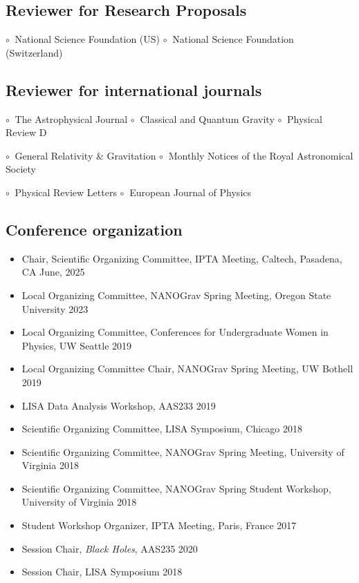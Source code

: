 \documentclass[11pt,letterpaper,sans,unicode]{moderncv}
\newcommand{\confitem}[2]{\item #1 \hfill #2} %
\newcommand{\blucirc}{{\color{color1} $\circ\;\;$}}
\begin{document}
 \vspace{-0.1cm}

 \vspace{-0.1cm}

\subsection{Reviewer for Research Proposals}
\hspace{0.5mm} \blucirc National Science Foundation (US)  \hfill \blucirc National Science Foundation (Switzerland) \hfill

\subsection{Reviewer for international journals}
\hspace{0.5mm} \blucirc The Astrophysical Journal  \hfill \blucirc Classical and Quantum Gravity \hfill \hspace{-0.2cm} \blucirc Physical Review D

\hspace{0.5mm} \blucirc General Relativity \& Gravitation  \hfill \blucirc Monthly Notices of the Royal Astronomical Society

\hspace{0.5mm} \blucirc Physical Review Letters  \hfill \blucirc European Journal of Physics


\subsection{Conference organization}
	\begin{itemize}[leftmargin=8mm]
	\confitem{Chair, Scientific Organizing Committee, IPTA Meeting, Caltech, Pasadena, CA}{June, 2025}
	\confitem{Local Organizing Committee, NANOGrav Spring Meeting, Oregon State University}{2023}
	\confitem{Local Organizing Committee, Conferences for Undergraduate Women in Physics, UW Seattle}{2019}
	\confitem{Local Organizing Committee Chair, NANOGrav Spring Meeting, UW Bothell}{2019}
	\confitem{LISA Data Analysis Workshop, AAS233}{2019}
	\confitem{Scientific Organizing Committee, LISA Symposium, Chicago}{2018}
	\confitem{Scientific Organizing Committee, NANOGrav Spring Meeting, University of Virginia}{2018}
	\confitem{Scientific Organizing Committee, NANOGrav Spring Student Workshop, University of Virginia}{2018}
    	\confitem{Student Workshop Organizer, IPTA Meeting, Paris, France}{2017}
	\confitem{Session Chair, \emph{Black Holes}, AAS235}{2020}
	\confitem{Session Chair, LISA Symposium}{2018}
	\end{itemize}
\end{document}
